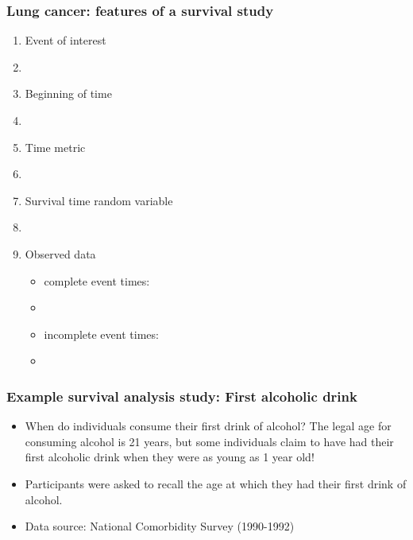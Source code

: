\begin{frame}
\frametitle{Lung cancer: features of a survival study}
\begin{enumerate}
\item Event of interest %
\item[]
\item Beginning of time %
\item[]
\item Time metric %
\item[]
\item Survival time random variable %
\item[]
\item Observed data
\begin{itemize}
\item complete event times: %
\item[]
\item incomplete event times: %
\item[]
\end{itemize}
\end{enumerate}
\end{frame}


\begin{frame}
\frametitle{Example survival analysis study:  First alcoholic drink}
\begin{itemize}
\item  When do individuals consume their first drink of alcohol?  The legal age for consuming alcohol is 21 years, but some individuals claim to have had their first alcoholic drink when they were as young as 1 year old!
\item Participants were asked to recall the age at which they had their first drink of alcohol.
\item Data source: National Comorbidity Survey (1990-1992)
\end{itemize}
\end{frame}

